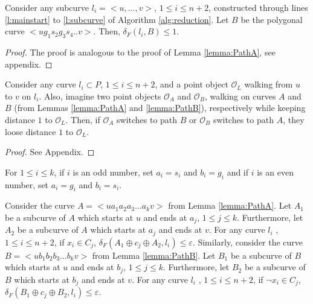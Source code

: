 \documentclass[a4paper,UKenglish]{lipics}
\newcommand{\eps}{\varepsilon}
\newcommand{\REM}[1]{}
\newcommand{\CS}{{\mathscr S}}
\newcommand{\CO}{{\mathscr O}}
\newcommand{\CQ}{{\mathscr Q}}
\newcommand{\gre}{{g}}
\newcommand{\sma}{{s}}
\newcommand{\cfev}{{l}} \newcommand{\sq}{{\CS\CQ}}
\newcommand{\distF}{\delta_F}
\newcommand{\ap}{\oplus}
\begin{document}
\begin{lemma}\label{lemma:PathB}
Consider any subcurve $\cfev_i =<u,...,v>$, $1\le i \le n+2$,  
constructed through lines \ref{l:mainstart} to \ref{l:subcurve} 
of Algorithm \ref{alg:reduction}. Let $B$ be the polygonal curve  $<u\gre_1\sma_2\gre_3\sma_4..v>$. Then, $\distF(\cfev_i,B) \le 1$.
\end{lemma}

\begin{proof}
The proof is analogous to the proof of Lemma \ref{lemma:PathA}, see appendix.
\end{proof}





	



\begin{lemma}\label{lemma:NoSwitchFromAtoB}
Consider any curve $\cfev_i \subset P $, $1\le i \le n+2$, and 
a point object $\CO_L$ walking from $u$ to $v$ on $\cfev_i$. 
Also, imagine two point objects $\CO_A$ and 
$\CO_B$, walking on curves $A$ and $B$ 
(from Lemmas \ref{lemma:PathA} and \ref{lemma:PathB}), respectively
while keeping distance $1$ to $\CO_L$. Then,
if $\CO_A$ switches to path $B$ or $\CO_B$ switches to path $A$, 
they loose distance $1$ to $\CO_L$.
\REM{
take any path to a vertex on $B$ and 
stay in distance 1 to $\CO_L$. Similarly, 
$\CO_B$ can not take any path to a vertex on $A$ and 
stay in distance 1 to $\CO_L$.}
\end{lemma}

\begin{proof}
See Appendix.
\end{proof}









For $1 \le i \le k$, 
if $i$ is an odd number, set $a_i = \sma_i$ 
and $b_i = \gre_i$  and
if $i$ is an even number, 
set $a_i = \gre_i$ 
and $b_i = \sma_i$.




\begin{lemma}\label{lemma:ABCanSeeC}
Consider the curve $A = <ua_1a_2a_3 \dots a_k v>$ from Lemma \ref{lemma:PathA}. Let 
$A_1$ be a subcurve of $A$ which starts at $u$ and ends at $a_j$, $1 \le j \le k$.
Furthermore, let $A_2$ be a subcurve of $A$ which starts at $a_j$ and ends at $v$.
For any curve $\cfev_i$ , $1\le i \le n+2$,
if $x_i \in C_j$, 
$\distF(A_1 \ap c_j \ap A_2, \cfev_i) \le \eps$. 
Similarly, consider the curve $B = <ub_1b_2b_3 \dots b_k v>$ from Lemma \ref{lemma:PathB}. Let 
$B_1$ be a subcurve of $B$ which starts at $u$ and ends at $b_j$, $1 \le j \le k$.
Furthermore, let $B_2$ be a subcurve of $B$ which starts at $b_j$ and ends at $v$.
For any curve $\cfev_i$ , $1\le i \le n+2$,
if $\neg x_i \in C_j$,   
$\distF(B_1 \ap c_j \ap B_2, \cfev_i) \le \eps$. 

\end{lemma}
\end{document}
